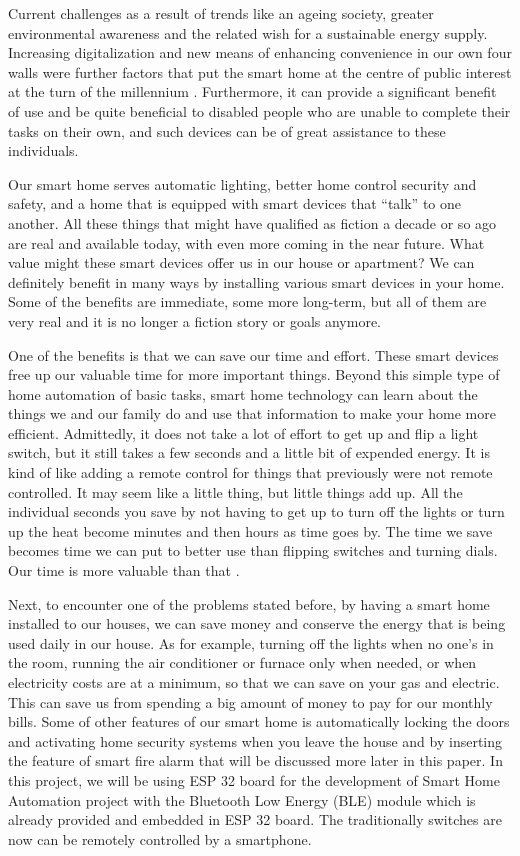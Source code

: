 Current challenges as a result of trends like an ageing society, greater environmental awareness and the related wish for a sustainable energy supply. Increasing digitalization and new means of enhancing convenience in our own four walls were further factors that put the smart home at the centre of public interest at the turn of the millennium . Furthermore, it can provide a significant benefit of use and be quite beneficial to disabled people who are unable to complete their tasks on their own, and such devices can be of great assistance to these individuals.

Our smart home serves automatic lighting, better home control security and safety, and a home that is equipped with smart devices that “talk” to one another. All these things that might have qualified as fiction a decade or so ago are real and available today, with even more coming in the near future. What value might these smart devices offer us in our house or apartment? We can definitely benefit in many ways by installing various smart devices in your home. Some of the benefits are immediate, some more long-term, but all of them are very real and it is no longer a fiction story or goals anymore.

One of the benefits is that we can save our time and effort. These smart devices free up our valuable time for more important things. Beyond this simple type of home automation of basic tasks, smart home technology can learn about the things we and our family do and use that information to make your home more efficient. Admittedly, it does not take a lot of effort to get up and flip a light switch, but it still takes a few seconds and a little bit of expended energy. It is kind of like adding a remote control for things that previously were not remote controlled. It may seem like a little thing, but little things add up. All the individual seconds you save by not having to get up to turn off the lights or turn up the heat become minutes and then hours as time goes by. The time we save becomes time we can put to better use than flipping switches and turning dials. Our time is more valuable than that \cite{b1}.

Next, to encounter one of the problems stated before, by having a smart home installed to our houses, we can save money and conserve the energy that is being used daily in our house. As for example, turning off the lights when no one’s in the room, running the air conditioner or furnace only when needed, or when electricity costs are at a minimum, so that we can save on your gas and electric. This can save us from spending a big amount of money to pay for our monthly bills. Some of other features of our smart home is automatically locking the doors and activating home security systems when you leave the house and by inserting the feature of smart fire alarm that will be discussed more later in this paper. In this project, we will be using ESP 32 board for the development of Smart Home Automation project with the Bluetooth Low Energy (BLE) module which is already provided and embedded in ESP 32 board. The traditionally switches are now can be remotely controlled by a smartphone.
